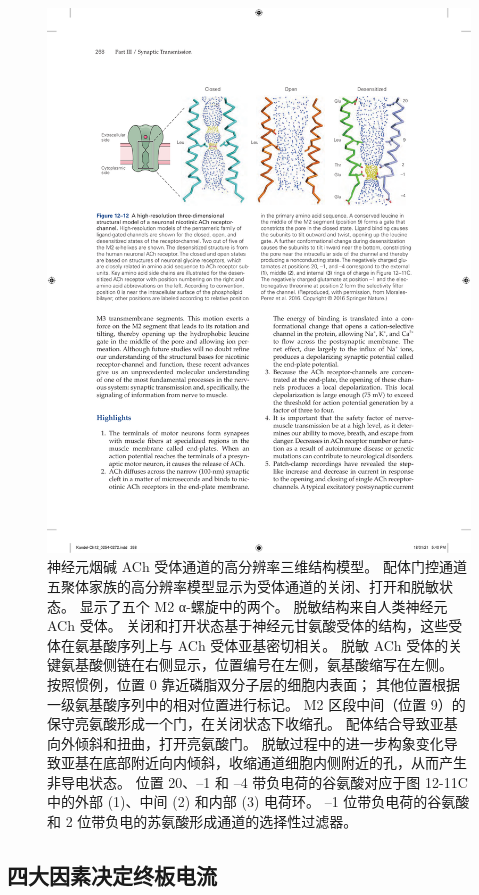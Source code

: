 \begin{figure}[htbp]
	\centering
	\includegraphics[width=0.9\linewidth]{chap12/fig_12_12}
	\caption{神经元烟碱 ACh 受体通道的高分辨率三维结构模型。 配体门控通道五聚体家族的高分辨率模型显示为受体通道的关闭、打开和脱敏状态。
		显示了五个 M2 α-螺旋中的两个。
		脱敏结构来自人类神经元 ACh 受体。
		关闭和打开状态基于神经元甘氨酸受体的结构，这些受体在氨基酸序列上与 ACh 受体亚基密切相关。
		脱敏 ACh 受体的关键氨基酸侧链在右侧显示，位置编号在左侧，氨基酸缩写在左侧。
		按照惯例，位置 0 靠近磷脂双分子层的细胞内表面；
		其他位置根据一级氨基酸序列中的相对位置进行标记。
		M2 区段中间（位置 9）的保守亮氨酸形成一个门，在关闭状态下收缩孔。
		配体结合导致亚基向外倾斜和扭曲，打开亮氨酸门。
		脱敏过程中的进一步构象变化导致亚基在底部附近向内倾斜，收缩通道细胞内侧附近的孔，从而产生非导电状态。
		位置 20、–1 和 –4 带负电荷的谷氨酸对应于图 12-11C 中的外部 (1)、中间 (2) 和内部 (3) 电荷环。
		–1 位带负电荷的谷氨酸和 2 位带负电的苏氨酸形成通道的选择性过滤器\cite{morales2016x}。}
	\label{fig:12_12}
\end{figure}



\subsection{四大因素决定终板电流}

